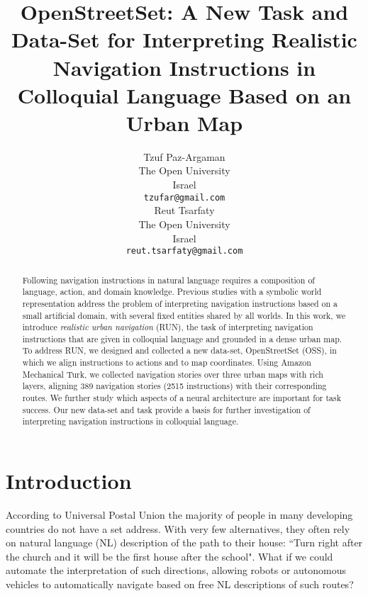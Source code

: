 \documentclass[11pt,a4paper]{article}
\title{OpenStreetSet: A New Task and Data-Set for Interpreting Realistic Navigation Instructions in Colloquial Language Based on an Urban Map}
\author{Tzuf Paz-Argaman \\
  The Open University\\
  Israel \\
  {\tt tzufar@gmail.com} \\\And
  Reut Tsarfaty \\
  The Open University\\
  Israel \\
  {\tt reut.tsarfaty@gmail.com} \\}
\date{}
\begin{document}
\maketitle
\begin{abstract}

  Following navigation instructions in natural language requires a composition of language, action, and domain knowledge. Previous studies with a symbolic world representation address the problem of interpreting navigation instructions based on a small artificial domain, with several fixed entities shared by all worlds. In this work, we introduce {\em realistic urban navigation} (RUN), the task of interpreting navigation instructions that are given in colloquial language and grounded in a dense urban map. To address RUN, we designed and collected a new data-set, OpenStreetSet (OSS), in which we align instructions to actions and to map coordinates.  Using Amazon Mechanical Turk, we collected navigation stories over three  urban maps with rich layers, aligning 389 navigation stories (2515  instructions) with their corresponding routes. We further study which aspects of a
neural architecture are important for task success. Our new data-set and task provide a basis for further investigation of interpreting navigation instructions in colloquial language.  
\end{abstract}


\section{Introduction}

According to Universal Postal Union \citep{upupaper} the majority of people in many developing countries do not have a set address. With very few alternatives, they often rely on natural language (NL) description of the path to their house: ``Turn right after the church and it will be the first house after the school". What if we could automate the interpretation of such directions, allowing robots or autonomous vehicles to automatically navigate based on free NL descriptions of such routes?  \par
\end{document}
